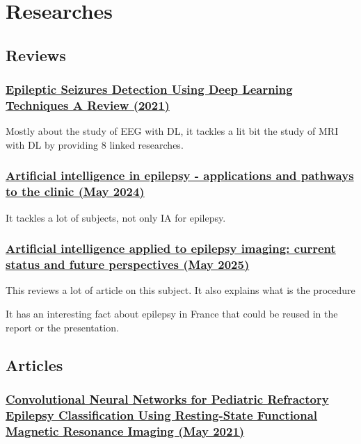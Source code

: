 \chapter{Researches}

\section{Reviews}

\subsection{\href{https://www.mdpi.com/1660-4601/18/11/5780\#B141-ijerph-18-05780}{Epileptic Seizures Detection Using Deep Learning Techniques A Review (2021)}}

Mostly about the study of EEG with DL, it tackles a lit bit the study of MRI with DL by providing 8 linked researches.

\subsection{\href{https://www.nature.com/articles/s41582-024-00965-9}{Artificial intelligence in epilepsy - applications and pathways to the clinic (May 2024)}}

It tackles a lot of subjects, not only IA for epilepsy.

\subsection{\href{https://www.sciencedirect.com/science/article/pii/S0035378725004874}{Artificial intelligence applied to epilepsy imaging: current status and future perspectives (May 2025)}}

This reviews a lot of article on this subject.
It also explains what is the procedure

It has an interesting fact about epilepsy in France that could be reused in the report or the presentation.

\section{Articles}

\subsection{\href{https://www.sciencedirect.com/science/article/pii/S187887502032698X\#abssec0015}{Convolutional Neural Networks for Pediatric Refractory Epilepsy Classification Using Resting-State Functional Magnetic Resonance Imaging (May 2021)}}
\label{sub:sec:cnn}


